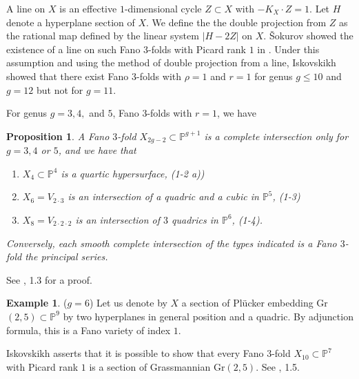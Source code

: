 \documentclass[11pt]{amsart}
\theoremstyle{plain}
\newtheorem{proposition}[theorem]{Proposition}
\theoremstyle{definition}
\newtheorem{example}[theorem]{Example}
\theoremstyle{expl}
\begin{document}
A line on $X$ is an effective $1$-dimensional cycle $Z \subset X$ with $-K_X \cdot Z=1$. Let $H$ denote a hyperplane section of $X$. We define the the double projection from $Z$ as the rational map defined by the linear system $|H-2Z|$ on $X$.
\v{S}okurov showed the existence of a line on such Fano $3$-folds with Picard rank $1$ in \cite{Sokuline}. Under this assumption and using the method of double projection from a line, Iskovskikh showed that there exist Fano $3$-folds with $\rho =1$ and $r=1$ for genus $g \leq 10$ and $g=12$ but not for $g=11$.

For genus $g=3, 4,$ and $5$, Fano $3$-folds with $r=1$, we have
\begin{proposition}
    A Fano $3$-fold $X_{2g-2}\subset \mathbb{P}^{g+1}$ is a complete intersection only for $g=3, 4$ or $5$, and we have that 
    \begin{enumerate}
    \item[$g=3$.]$X_4 \subset \mathbb{P}^4$ is a quartic hypersurface, (1-2 a))
    \item[$g=4$.]$X_6 = V_{2\cdot 3}$ is an intersection of a quadric and a cubic in $\mathbb{P}^5$, (1-3)
    \item[$g=5$.]$X_8 = V_{2\cdot 2\cdot 2}$ is an intersection of $3$ quadrics in $\mathbb{P}^6$, (1-4).
    \end{enumerate}
    Conversely, each smooth complete intersection of the types indicated is a Fano $3$-fold the principal series. 
\end{proposition}
See \cite{Isk78}, 1.3 for a proof.
 
\begin{example}
        ($g=6$) Let us denote by $X$ a section of Pl\"{u}cker embedding Gr$(2,5) \subset \mathbb{P}^9$ by two hyperplanes in general position and a quadric. By adjunction formula, this is a Fano variety of index $1$.
\end{example}
Iskovskikh asserts that it is possible to show that every Fano $3$-fold $X_{10} \subset \mathbb{P}^7$ with Picard rank $1$ is a section of Grassmannian Gr$(2,5)$. See \cite{Isk78}, 1.5.
\end{document}
